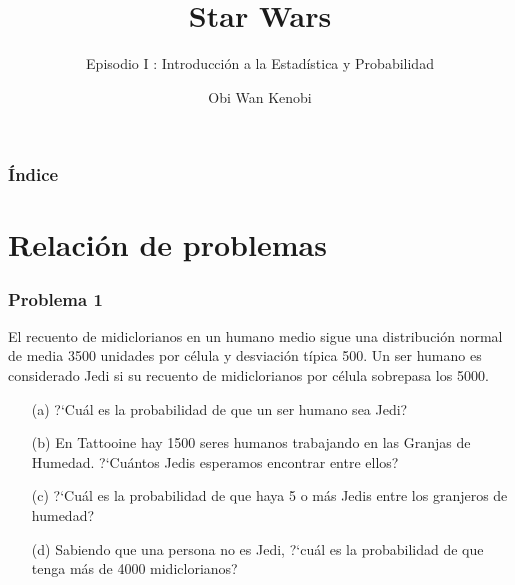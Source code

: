 \documentclass{beamer}
\title[Episode V]{Star Wars}
\subtitle{Episodio I : Introducci\'on a la Estad\'istica y Probabilidad}
\author{Obi Wan Kenobi}
\begin{document}
   
    
  \pagetitle 
  
  
\begin{frame}
\frametitle{\'Indice}
\tableofcontents
\end{frame}
 
  
\section{Relaci\'on de problemas}          
\begin{frame}
\frametitle{Problema 1\ \small{\textit{\color{red}{(tomado de Tito Eliatron @eliatron)}}}}
El recuento de midiclorianos en un humano medio sigue una distribuci\'on normal de media 3500 unidades por c\'elula y desviaci\'on t\'ipica 500. Un ser humano es considerado Jedi si su recuento de midiclorianos por c\'elula sobrepasa los 5000.

\begin{itemize}
\item[(a)] ?`Cu\'al es la probabilidad de que un ser humano sea Jedi?
\item[(b)] En Tattooine hay 1500 seres humanos trabajando en las Granjas de Humedad. ?`Cu\'antos Jedis esperamos encontrar entre ellos?
\item[(c)] ?`Cu\'al es la probabilidad de que haya 5 o m\'as Jedis entre los granjeros de humedad?
\item[(d)] Sabiendo que una persona no es Jedi, ?`cu\'al es la probabilidad de que tenga m\'as de 4000 midiclorianos?
\end{itemize}
\texttt{\color{red}{https://www.youtube.com/watch?v=DML07xIy-ro\&t=7s}}
\end{frame}
  
\end{document}
